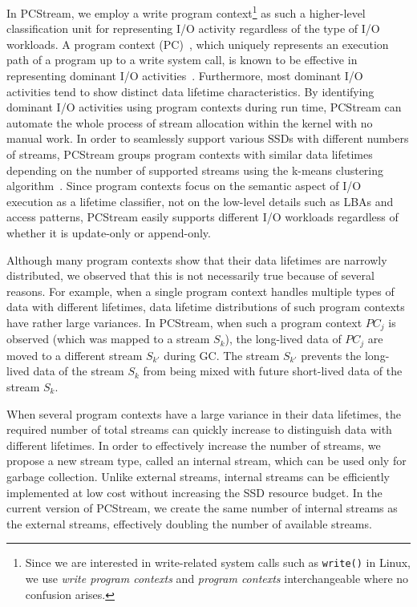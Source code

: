 In \textsf{\small PCStream}, we employ a write program context\footnote{
Since we are interested in write-related system calls such as {\tt write()} in
Linux, we use {\it write program contexts} and {\it program contexts}
interchangeable where no confusion arises.} as such a higher-level
classification unit for representing I/O activity regardless of the type of I/O
workloads.  A program context (PC)~\cite{PC, PC2}, which uniquely represents an
execution path of a program up to a write system call, is known to be effective
in representing dominant I/O activities~\cite{PCHa}.  Furthermore, most
dominant I/O activities tend to show distinct data lifetime characteristics.
By identifying dominant I/O activities using program contexts during run time,
\textsf{\small PCStream} can automate the whole process of stream allocation
within the kernel with no manual work.  In order to seamlessly support various
SSDs with different numbers of streams, \textsf{\small PCStream} groups program
contexts with similar data lifetimes depending on the number of supported
streams using the k-means clustering algorithm~\cite{kmeans}.  Since program
contexts focus on the semantic aspect of I/O execution as a lifetime
classifier, not on the low-level details such as LBAs and access patterns,
\textsf{\small PCStream} easily supports different I/O workloads regardless of
whether it is update-only or append-only.   

Although many program contexts show that their data lifetimes are narrowly
distributed, we observed that this is not necessarily true because of several
reasons.  For example, when a single program context handles multiple types of
data with different lifetimes, data lifetime distributions of such program
contexts  have rather large variances.  In \textsf{\small PCStream}, when such
a program context {\it $PC_j$} is observed (which was mapped to a stream {\it
$S_k$}), the long-lived data of {\it $PC_j$} are moved to a different stream
{\it $S_{k'}$} during GC.  The stream {\it $S_{k'}$} prevents the long-lived
data of the stream {\it $S_k$} from being mixed with future short-lived data of
the stream {\it $S_k$}.

When several program contexts have a large variance in their data lifetimes,
the required number of total streams can quickly increase to distinguish data
with different lifetimes.
In order to effectively increase the number of streams, we propose a new stream
type, called an internal stream, which can be used only for garbage collection.
Unlike external streams, internal streams can be efficiently implemented at low
cost without increasing the SSD resource budget.  In the current version of
\textsf{\small PCStream}, we create the same number of internal streams as the
external streams, effectively doubling the number of available streams. 

